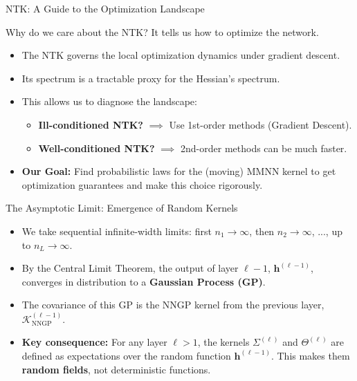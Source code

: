 \documentclass{beamer}
\begin{document}
\begin{frame}{NTK: A Guide to the Optimization Landscape}
\begin{block}{Why do we care about the NTK?}
It tells us how to optimize the network.
\end{block}
\begin{itemize}
    \item The NTK governs the local optimization dynamics under gradient descent.
    \item Its spectrum is a tractable proxy for the Hessian's spectrum.
    \item This allows us to diagnose the landscape:
    \begin{itemize}
        \item \textbf{Ill-conditioned NTK?} $\implies$ Use 1st-order methods (Gradient Descent).
        \item \textbf{Well-conditioned NTK?} $\implies$ 2nd-order methods can be much faster.
    \end{itemize}
    \item \textbf{Our Goal:} Find probabilistic laws for the (moving) MMNN kernel to get optimization guarantees and make this choice rigorously.
\end{itemize}
\end{frame}

\begin{frame}{The Asymptotic Limit: Emergence of Random Kernels}
\begin{itemize}
    \item We take sequential infinite-width limits: first $n_1 \to \infty$, then $n_2 \to \infty$, ..., up to $n_L \to \infty$.
    \item By the Central Limit Theorem, the output of layer $\ell-1$, $\bm{h}^{(\ell-1)}$, converges in distribution to a \textbf{Gaussian Process (GP)}.
    \item The covariance of this GP is the NNGP kernel from the previous layer, $\mathcal{K}_{\text{NNGP}}^{(\ell-1)}$.
    \item \textbf{Key consequence:} For any layer $\ell > 1$, the kernels $\Sigma^{(\ell)}$ and $\Theta^{(\ell)}$ are defined as expectations over the random function $\bm{h}^{(\ell-1)}$. This makes them \textbf{random fields}, not deterministic functions.
\end{itemize}
\end{frame}
\end{document}
